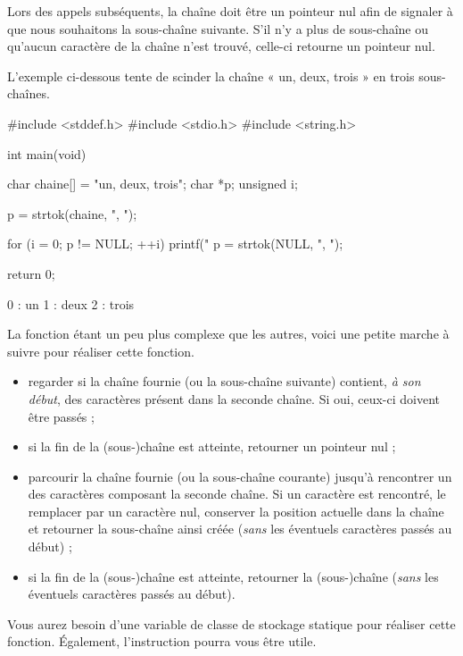 Lors des appels subséquents, la chaîne  doit être un
pointeur nul afin de signaler à  que nous souhaitons la
sous-chaîne suivante. S'il n'y a plus de sous-chaîne ou qu'aucun
caractère de la chaîne  n'est trouvé, celle-ci retourne un
pointeur nul.

L'exemple ci-dessous tente de scinder la chaîne « un, deux, trois » en
trois sous-chaînes.

\begin{C}
#include <stddef.h>
#include <stdio.h>
#include <string.h>


int main(void)
{
    char chaine[] = "un, deux, trois";
    char *p;
    unsigned i;

    p = strtok(chaine, ", ");

    for (i = 0; p != NULL; ++i)
    {
        printf("%
        p = strtok(NULL, ", ");
    }

    return 0;
}
\end{C}

\begin{C}
0 : un
1 : deux
2 : trois
\end{C}

La fonction  étant un peu plus complexe que les autres,
voici une petite marche à suivre pour réaliser cette fonction.

\begin{itemize}
\item
  regarder si la chaîne fournie (ou la sous-chaîne suivante) contient,
  \emph{à son début}, des caractères présent dans la seconde chaîne. Si
  oui, ceux-ci doivent être passés ;
\item
  si la fin de la (sous-)chaîne est atteinte, retourner un pointeur nul
  ;
\item
  parcourir la chaîne fournie (ou la sous-chaîne courante) jusqu'à
  rencontrer un des caractères composant la seconde chaîne. Si un
  caractère est rencontré, le remplacer par un caractère nul, conserver
  la position actuelle dans la chaîne et retourner la sous-chaîne ainsi
  créée (\emph{sans} les éventuels caractères passés au début) ;
\item
  si la fin de la (sous-)chaîne est atteinte, retourner la (sous-)chaîne
  (\emph{sans} les éventuels caractères passés au début).
\end{itemize}

\begin{infobox}
  Vous aurez besoin d'une variable de
classe de stockage statique pour réaliser cette fonction. Également,
l'instruction  pourra vous être utile.
\end{infobox}



